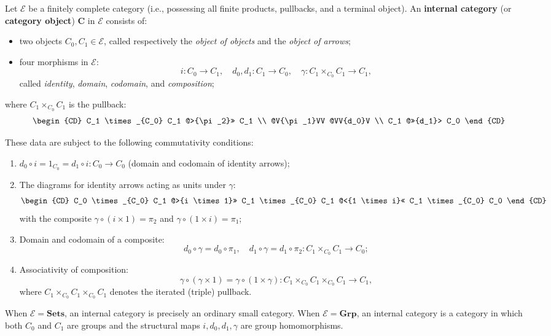 Let $\mathcal{E}$ be a finitely complete category (i.e., possessing all finite products, pullbacks, and a terminal object). An \textbf{internal category} (or \textbf{category object}) $\mathbf{C}$ in $\mathcal{E}$ consists of:

\begin{itemize}
\item two objects $C_0, C_1 \in \mathcal{E}$, called respectively the \textit{object of objects} and the \textit{object of arrows};
\item four morphisms in $\mathcal{E}$:
  $$i : C_0 \to C_1, \quad d_0, d_1 : C_1 \to C_0, \quad \gamma : C_1 \times_{C_0} C_1 \to C_1,$$
  called \textit{identity}, \textit{domain}, \textit{codomain}, and \textit{composition};
\end{itemize}

where $C_1 \times_{C_0} C_1$ is the pullback:
\[
\begin{CD}
C_1 \times_{C_0} C_1 @>{\pi_2}>> C_1 \\
@V{\pi_1}VV @VV{d_0}V \\
C_1 @>>{d_1}> C_0
\end{CD}
\]

These data are subject to the following commutativity conditions:
\begin{enumerate}
\item $d_0 \circ i = 1_{C_0} = d_1 \circ i : C_0 \to C_0$ \quad (domain and codomain of identity arrows);
\item The diagrams for identity arrows acting as units under $\gamma$:
\[
\begin{CD}
C_0 \times_{C_0} C_1 @>{i \times 1}>> C_1 \times_{C_0} C_1 @<{1 \times i}<< C_1 \times_{C_0} C_0
\end{CD}
\]
with the composite $\gamma \circ (i \times 1) = \pi_2$ and $\gamma \circ (1 \times i) = \pi_1$;
\item Domain and codomain of a composite:
\[
d_0 \circ \gamma = d_0 \circ \pi_1, \quad d_1 \circ \gamma = d_1 \circ \pi_2 : C_1 \times_{C_0} C_1 \to C_0;
\]
\item Associativity of composition:
\[
\gamma \circ (\gamma \times 1) = \gamma \circ (1 \times \gamma) : C_1 \times_{C_0} C_1 \times_{C_0} C_1 \to C_1,
\]
where $C_1 \times_{C_0} C_1 \times_{C_0} C_1$ denotes the iterated (triple) pullback.
\end{enumerate}

When $\mathcal{E} = \mathbf{Sets}$, an internal category is precisely an ordinary small category. When $\mathcal{E} = \mathbf{Grp}$, an internal category is a category in which both $C_0$ and $C_1$ are groups and the structural maps $i, d_0, d_1, \gamma$ are group homomorphisms.
